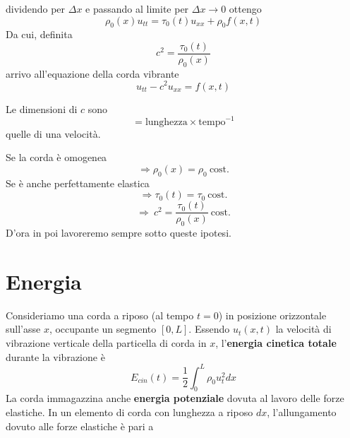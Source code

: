 \documentclass[10pt,a4paper,twoside,openright]{book}
\begin{document}
dividendo per $\displaystyle \Delta x$ e passando al limite per $\displaystyle \Delta x\rightarrow 0$ ottengo
\begin{equation*}
	\rho _{0}( x) u_{tt} =\tau _{0}( t) u_{xx} +\rho _{0} f( x,t)
\end{equation*}
Da cui, definita
\begin{equation*}
	c^{2} =\frac{\tau _{0}( t)}{\rho _{0}( x)}
\end{equation*}
arrivo all'equazione della corda vibrante
\begin{equation*}
	\boxed{u_{tt} -c^{2} u_{xx} =f( x,t)}
\end{equation*}
\begin{nb}
	Le dimensioni di $\displaystyle c$ sono
	\begin{equation*}
		[ c] =\text{lunghezza} \times \text{tempo}^{-1}
	\end{equation*}
	quelle di una velocità.
\end{nb}
\begin{nb}
	Se la corda è omogenea
	\begin{equation*}
		\Rightarrow \rho _{0}( x) =\rho _{0} \ \text{cost.}
	\end{equation*}
	Se è anche perfettamente elastica
	\begin{equation*}
		\Rightarrow \tau _{0}( t) =\tau _{0} \ \text{cost.}
	\end{equation*}
	\begin{equation*}
		\Rightarrow \ c^{2} =\frac{\tau _{0}( t)}{\rho _{0}( x)} \ \text{cost.}
	\end{equation*}
	D'ora in poi lavoreremo sempre sotto queste ipotesi.
\end{nb}
\section{Energia}

Consideriamo una corda a riposo (al tempo $\displaystyle t=0$) in posizione orizzontale sull'asse $\displaystyle x$, occupante un segmento $\displaystyle [ 0,L]$. Essendo $\displaystyle u_{t}( x,t)$ la velocità di vibrazione verticale della particella di corda in $\displaystyle x$, l'\textbf{energia cinetica totale }durante la vibrazione è
\begin{equation*}
	E_{cin}( t) =\frac{1}{2}\int ^{L}_{0} \rho _{0} u^{2}_{t} dx
\end{equation*}
La corda immagazzina anche \textbf{energia potenziale} dovuta al lavoro delle forze elastiche. In un elemento di corda con lunghezza a riposo $\displaystyle dx$, l'allungamento dovuto alle forze elastiche è pari a
\end{document}
